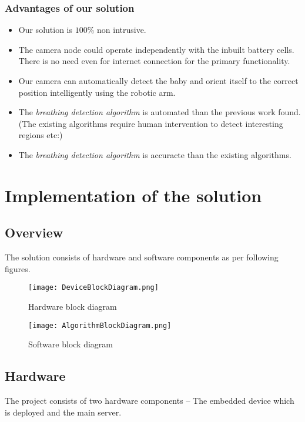 \documentclass{report}
\begin{document}
\subsection{Advantages of our solution}
\begin{itemize}
    \item Our solution is $100\%$ non intrusive.
    \item The camera node could operate independently with the inbuilt battery cells. There is no need even for internet connection for the primary functionality.
    \item Our camera can automatically detect the baby and orient itself to the correct position intelligently using the robotic arm.
    \item The \textit{breathing detection algorithm} is automated than the previous work found. (The existing algorithms require human intervention to detect interesting regions etc:)
    \item The \textit{breathing detection algorithm} is accuracte than the existing algorithms.
    
\end{itemize}



\chapter{Implementation of the solution}

\section{Overview}

The solution consists of hardware and software components as per following figures.

\begin{figure}[H]
    \centering
    \texttt{[image: DeviceBlockDiagram.png]}
    \caption{Hardware block diagram}
    \label{fig:my_label}
\end{figure}

\begin{figure}[H]
    \centering
    \texttt{[image: AlgorithmBlockDiagram.png]}
    \caption{Software block diagram}
    \label{fig:my_label}
\end{figure}

\section{Hardware}
The project consists of two hardware components -- The embedded device which is deployed and the main server.
\end{document}
